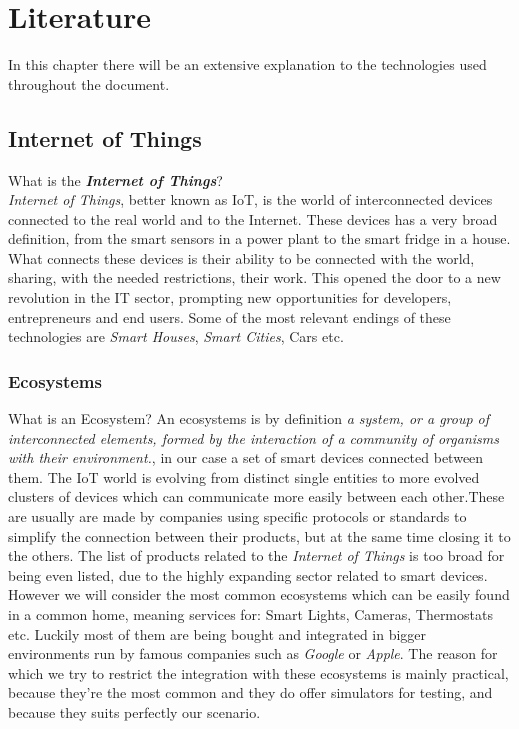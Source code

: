 \chapter{Literature}

In this chapter there will be an extensive explanation to the technologies used
throughout the document.

\section{Internet of Things}

What is the \textbf{\textit{Internet of Things}}?\\
\textit{Internet of Things}, better known as IoT, is the world of interconnected devices
connected to the real world and to the Internet. These devices has a very
broad definition, from the smart sensors in a power plant to the smart fridge in
a house. What connects these devices is their ability to be connected with the world,
sharing, with the needed restrictions, their work. This opened the door to a new
revolution in the IT sector, prompting new opportunities for developers, entrepreneurs
and end users. Some of the most relevant endings of these technologies are \textit{Smart Houses},
\textit{Smart Cities}, Cars etc. %

\subsection{Ecosystems}

What is an Ecosystem? An ecosystems is by definition \textit{a system, or a group of interconnected elements,
formed by the interaction of a community of organisms with their environment.},
in our case a set of smart devices connected between them. The IoT world is evolving
from distinct single entities to more evolved clusters of devices which can communicate
more easily between each other.These are usually are made by companies using specific protocols or standards
to simplify the connection between their products, but at the same time closing it to the others.
The list of products related to the \textit{Internet of Things} is too broad for
being even listed, due to the highly expanding sector related to smart devices.
However we will consider the most common ecosystems which can be easily found in a common
home, meaning services for: Smart Lights, Cameras, Thermostats etc. Luckily
most of them are being bought and integrated in bigger environments run by
famous companies such as \textit{Google} or \textit{Apple}.
The reason for which we try to restrict the integration with these ecosystems is
mainly practical, because they're the most common and they do offer simulators
for testing, and because they suits perfectly our scenario.


